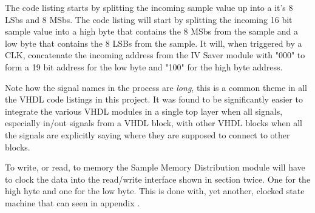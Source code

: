 The code listing starts by splitting the incoming sample value up into a it's 8 LSbs and 8 MSbs.
The code listing will start by splitting the incoming 16 bit sample value into a high byte that contains the 8 MSbs from the sample and a low byte that contains the 8 LSBs from the sample. It will, when triggered by a CLK, concatenate the incoming address from the IV Saver module with "000" to form a 19 bit address for the low byte and "100" for the high byte address.

Note how the signal names in the process are \textit{long}, this is a common theme in all the VHDL code listings in this project. It was found to be significantly easier to integrate the various VHDL modules in a single top layer when all signals, especially in/out signals from a VHDL block, with other VHDL blocks when all the signals are explicitly saying where they are supposed to connect to other blocks.

To write, or read, to memory the Sample Memory Distribution module will have to clock the data into the read/write interface shown in section  twice. One for the high hyte and one for the low byte. This is done with, yet another, clocked state machine that can seen in appendix .

